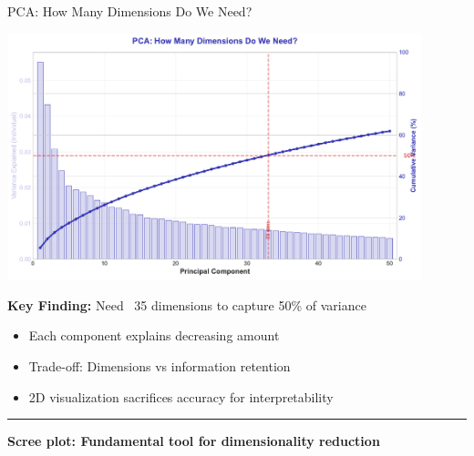 \documentclass[8pt,aspectratio=169]{beamer}
\newcommand{\bottomnote}[1]{%
\vfill
\vspace{-2mm}
\textcolor{mllavender2}{\rule{\textwidth}{0.4pt}}
\vspace{1mm}
\footnotesize
\textbf{#1}
}
\begin{document}
\begin{frame}[t]{PCA: How Many Dimensions Do We Need?}

\begin{center}
\includegraphics[width=0.9\textwidth,height=0.68\textheight]{charts/pca_variance_explained.pdf}
\end{center}

\vspace{0.2cm}

\textbf{Key Finding:} Need ~35 dimensions to capture 50\% of variance

\begin{itemize}
    \item Each component explains decreasing amount
    \item Trade-off: Dimensions vs information retention
    \item 2D visualization sacrifices accuracy for interpretability
\end{itemize}

\bottomnote{Scree plot: Fundamental tool for dimensionality reduction}
\end{frame}
\end{document}
